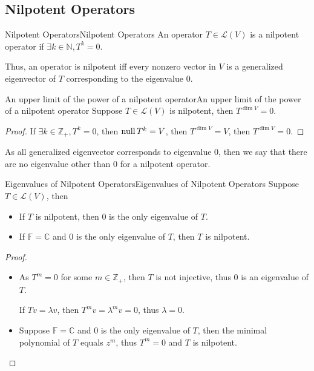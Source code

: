 \documentclass[../main.tex]{subfiles}
\begin{document}
\subsection{Nilpotent Operators}
\begin{definition}{Nilpotent Operators}{Nilpotent Operators}
	An operator $T\in \mathscr{L}(V)$ is a nilpotent operator if $\exists k\in \mathbb{N}, T^k=0$.
\end{definition}
Thus, an operator is nilpotent iff every nonzero vector in $V$ is a generalized eigenvector of $T$ corresponding to the eigenvalue $0$.

\begin{proposition}{An upper limit of the power of a nilpotent operator}{An upper limit of the power of a nilpotent operator}
Suppose $T\in \mathscr{L}(V)$ is nilpotent, then $T^{\dim V}=0$.
\end{proposition}
\begin{proof}
	If $\exists k\in \mathbb{Z}_+, T^k=0$, then $\operatorname{null} T^k=V$, then $T^{\dim V} = V$, then $T^{\dim V}=0$.
\end{proof}

As all generalized eigenvector corresponds to eigenvalue $0$, then we say that there are no eigenvalue other than $0$ for a nilpotent operator.

\begin{theorem}{Eigenvalues of Nilpotent Operators}{Eigenvalues of Nilpotent Operators}
Suppose $T\in \mathscr{L}(V)$, then
\begin{itemize}
\item If $T$ is nilpotent, then $0$ is the only eigenvalue of $T$.
\item If $\mathbb{F}=\mathbb{C}$ and $0$ is the only eigenvalue of $T$, then $T$ is nilpotent.
\end{itemize}
\end{theorem}
\begin{proof}
\begin{itemize}
\item As $T^m=0$ for some $m\in \mathbb{Z}_+$, then $T$ is not injective, thus  $0$ is an eigenvalue of $T$.

	If $Tv = \lambda v$, then $T^mv=\lambda^mv = 0$, thus $\lambda=0$.
\item Suppose $\mathbb{F}=\mathbb{C}$ and $0$ is the only eigenvalue of $T$, then the minimal polynomial of $T$ equals $z^m$, thus $T^m=0$ and $T$ is nilpotent.
\end{itemize}
\end{proof}
\end{document}
